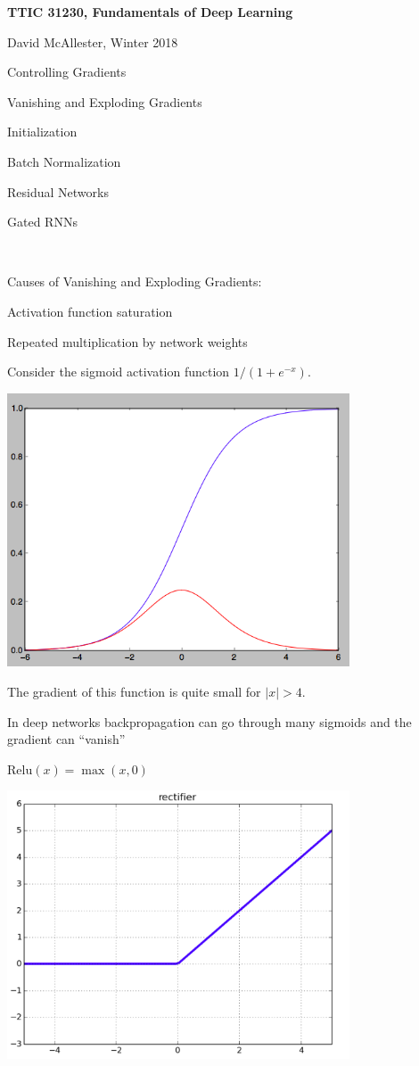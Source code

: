 




{\Huge

  \centerline{\bf TTIC 31230, Fundamentals of Deep Learning}
  \bigskip
  \centerline{David McAllester, Winter 2018}
  \vfill
  \centerline{Controlling Gradients}
  \vfill
  \vfill
  \centerline{Vanishing and Exploding Gradients}
  \vfill
  \centerline{Initialization}
  \vfill
  \centerline{Batch Normalization}
  \vfill
  \centerline{Residual Networks}
  \vfill
  \centerline{Gated RNNs}

~
\vfill
\centerline{Causes of Vanishing and Exploding Gradients:}
\vfill
\centerline{Activation function saturation}
\vfill
\centerline{Repeated multiplication by network weights}
\vfill


Consider the sigmoid activation function $1/(1+ e^{-x})$.

\vfill
\centerline{\includegraphics[width= 4.0in]{../images/sigmoid2}}


\vfill
The gradient of this function is quite small for $|x| > 4$.

\vfill
In deep networks backpropagation can go through many sigmoids and
the gradient can ``vanish''


$\mathrm{Relu}(x) = \max(x,0)$

\vfill
\centerline{\includegraphics[width= 4.0in]{../images/relu}}

}
